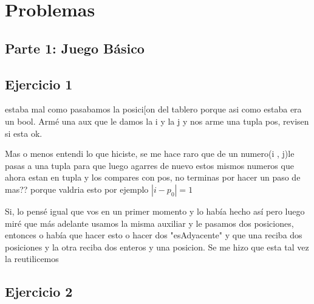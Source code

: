 \documentclass[a4paper]{article}
\begin{document}



\section{Problemas}


\subsection*{Parte 1: Juego Básico}


\subsection*{Ejercicio 1}

{\color{red} estaba mal como pasabamos la posici[on del tablero porque asi como estaba era un bool. Armé una aux que le damos la i y la j y nos arme una tupla pos, revisen si esta ok.}


{\color{blue} Mas o menos entendi lo que hiciste, se me hace raro que de un numero(i , j)le pasas a una tupla para que luego agarres de nuevo estos  mismos numeros que ahora estan en tupla y los compares con pos, no terminas por hacer un paso de mas?? porque valdria esto por ejemplo 
$|i - p_{0}| = 1$}

{\color{red} Si, lo pensé igual que vos en un primer momento y lo había hecho así pero luego miré que más adelante usamos la misma auxiliar y le pasamos dos posiciones, entonces o había que hacer esto o hacer dos  "esAdyacente" y que una reciba dos posiciones y la otra reciba dos enteros y una posicion. Se me hizo que esta tal vez la reutilicemos}

\subsection*{Ejercicio 2}
 {}
\end{document}
